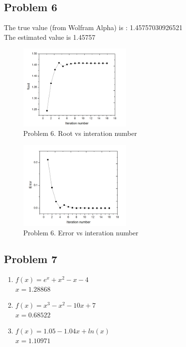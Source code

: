 \documentclass{article}
\begin{document}
\subsection*{{Problem 6}}
\label{}
The true value (from Wolfram Alpha)  is : 1.45757030926521\\
The estimated value is 1.45757
 \begin{figure}
 \centering 
 \includegraphics[width=0.5\textwidth]{root_6}
 \caption{Problem 6. Root vs interation number} 
 \end{figure} 
  \begin{figure}
 \centering 
 \includegraphics[width=0.5\textwidth]{error_6}
  \caption{Problem 6. Error vs interation number} 
 \end{figure} 

\hypertarget{problem_6_homework_checklist_2}{}
\subsection*{{Problem 7}}
\label{}
\begin{enumerate}
\item 
$f(x)=e^x+x^2-x-4 $  \\
$x=1.28868 $ \\
\item 
$f(x) =x^3-x^2-10x+7 $ \\
$x=0.68522 $\\
\item 
$f(x) = 1.05-1.04x+ln(x) $\\
$x= 1.10971$ \\

\end{enumerate}
\end{document}
